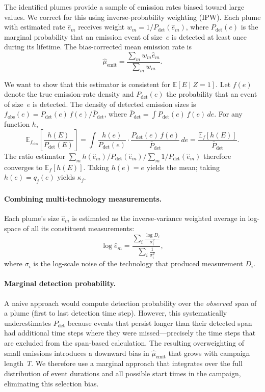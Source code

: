 \documentclass[11pt]{article}
\newcommand{\E}{\mathbb{E}}
\begin{document}
The identified plumes provide a sample of emission rates biased toward large values. We correct for this using inverse-probability weighting (IPW). Each plume with estimated rate $\hat{e}_m$ receives weight $w_m = 1/P_{\text{det}}(\hat{e}_m)$, where $P_{\text{det}}(e)$ is the marginal probability that an emission event of size~$e$ is detected at least once during its lifetime. The bias-corrected mean emission rate is
\begin{equation}
    \hat{\mu}_{\text{emit}} = \frac{\sum_m w_m \hat{e}_m}{\sum_m w_m}.
\end{equation}

We want to show that this estimator is consistent for $\E[E \mid Z = 1]$.
Let $f(e)$ denote the true emission-rate density and $P_{\text{det}}(e)$ the probability that an event of size~$e$ is detected. The density of detected emission sizes is $f_{\text{obs}}(e) = P_{\text{det}}(e)\,f(e)/\bar{P}_{\text{det}}$, where $\bar{P}_{\text{det}} = \int P_{\text{det}}(e)\,f(e)\,de$. For any function $h$,
\begin{equation}
    \E_{f_{\text{obs}}}\!\left[\frac{h(E)}{P_{\text{det}}(E)}\right] = \int \frac{h(e)}{P_{\text{det}}(e)} \cdot \frac{P_{\text{det}}(e)\,f(e)}{\bar{P}_{\text{det}}} \, de = \frac{\E_f[h(E)]}{\bar{P}_{\text{det}}}.
\end{equation}
The ratio estimator $\sum_m h(\hat{e}_m)/P_{\text{det}}(\hat{e}_m) \big/ \sum_m 1/P_{\text{det}}(\hat{e}_m)$ therefore converges to $\E_f[h(E)]$. Taking $h(e) = e$ yields the mean; taking $h(e) = q_j(e)$ yields $\kappa_j$.

\paragraph{Combining multi-technology measurements.}
Each plume's size $\hat{e}_m$ is estimated as the inverse-variance weighted average in log-space of all its constituent measurements:
\begin{equation}
    \log \hat{e}_m = \frac{\sum_i \frac{\log D_i}{\sigma_i^2}}{\sum_i \frac{1}{\sigma_i^2}},
\end{equation}
where $\sigma_i$ is the log-scale noise of the technology that produced measurement $D_i$.

\paragraph{Marginal detection probability.}
A naive approach would compute detection probability over the \emph{observed span} of a plume (first to last detection time step). However, this systematically underestimates $P_{\text{det}}$ because events that persist longer than their detected span had additional time steps where they were missed---precisely the time steps that are excluded from the span-based calculation. The resulting overweighting of small emissions introduces a downward bias in $\hat{\mu}_{\text{emit}}$ that grows with campaign length~$T$. We therefore use a marginal approach that integrates over the full distribution of event durations and all possible start times in the campaign, eliminating this selection bias.
\end{document}
